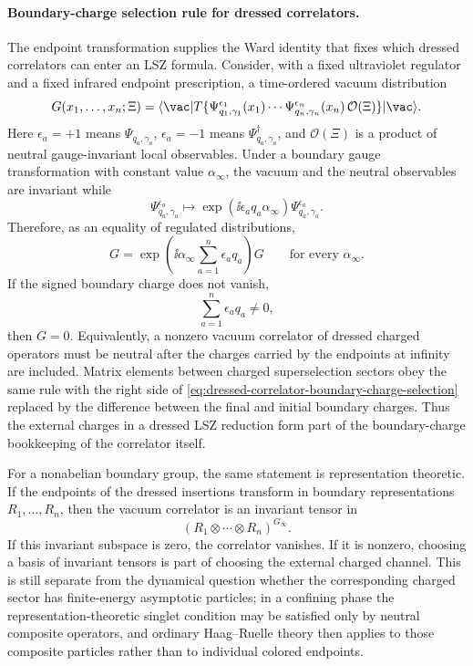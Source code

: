 \paragraph{Boundary-charge selection rule for dressed correlators.}
The endpoint transformation supplies the Ward identity that fixes which
dressed correlators can enter an LSZ formula.  Consider, with a fixed
ultraviolet regulator and a fixed infrared endpoint prescription, a
time-ordered vacuum distribution
\[
  G(x_1,\ldots,x_n;\Xi)
  =
  \langle\vac|
  T\{\Psi_{q_1,\gamma_1}^{\epsilon_1}(x_1)\cdots
      \Psi_{q_n,\gamma_n}^{\epsilon_n}(x_n)\,\mathcal O(\Xi)\}
  |\vac\rangle .
\]
Here \(\epsilon_a=+1\) means \(\Psi_{q_a,\gamma_a}\),
\(\epsilon_a=-1\) means \(\Psi_{q_a,\gamma_a}^{\dagger}\), and
\(\mathcal O(\Xi)\) is a product of neutral gauge-invariant local
observables.  Under a boundary gauge transformation with constant value
\(\alpha_\infty\), the vacuum and the neutral observables are invariant while
\[
  \Psi_{q_a,\gamma_a}^{\epsilon_a}
  \longmapsto
  \exp(\ii \epsilon_a q_a\alpha_\infty)
  \Psi_{q_a,\gamma_a}^{\epsilon_a}.
\]
Therefore, as an equality of regulated distributions,
\[
  G
  =
  \exp\!\left(
    \ii\alpha_\infty\sum_{a=1}^n\epsilon_a q_a
  \right)G
  \qquad\text{for every }\alpha_\infty .
\]
If the signed boundary charge does not vanish,
\begin{equation}
  \sum_{a=1}^n\epsilon_a q_a\ne0,
  \label{eq:dressed-correlator-boundary-charge-selection}
\end{equation}
then \(G=0\).  Equivalently, a nonzero vacuum correlator of dressed charged
operators must be neutral after the charges carried by the endpoints at
infinity are included.  Matrix elements between charged superselection
sectors obey the same rule with the right side of
\eqref{eq:dressed-correlator-boundary-charge-selection} replaced by the
difference between the final and initial boundary charges.  Thus the
external charges in a dressed LSZ reduction form part of the boundary-charge
bookkeeping of the correlator itself.

For a nonabelian boundary group, the same statement is representation
theoretic.  If the endpoints of the dressed insertions transform in boundary
representations \(R_1,\ldots,R_n\), then the vacuum correlator is an invariant
tensor in
\[
  (R_1\otimes\cdots\otimes R_n)^{G_\infty}.
\]
If this invariant subspace is zero, the correlator vanishes.  If it is
nonzero, choosing a basis of invariant tensors is part of choosing the
external charged channel.  This is still separate from the dynamical question
whether the corresponding charged sector has finite-energy asymptotic
particles; in a confining phase the representation-theoretic singlet
condition may be satisfied only by neutral composite operators, and ordinary
Haag--Ruelle theory then applies to those composite particles rather than to
individual colored endpoints.

